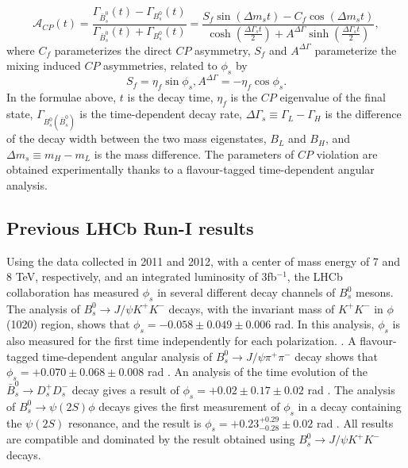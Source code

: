 \documentclass[10pt]{article}
\def\CP                {{\ensuremath{C\!P}}\xspace}
\begin{document}
\begin{equation}
\mathscr{A}_{CP} (t) = \frac{\Gamma_{\bar{B}^0_s}(t)-{\Gamma_{B^0_s}(t)}}{\Gamma_{\bar{B}^0_s}(t) + {\Gamma_{B^0_s}}(t)} = \frac{S_f \sin(\Delta m_s t) - C_f \cos(\Delta m_s t)}{\cosh(\frac{\Delta \Gamma_s  t }{2})  + A^{\Delta \Gamma} \sinh(\frac{\Delta \Gamma_s t}{2})},
\end{equation}
where $C_f$ parameterizes the direct \CP asymmetry,  $S_f$ and $A^{\Delta \Gamma}$ parameterize the mixing induced \CP asymmetries, related to $\phi_s$ by
\begin{equation}
S_f = \eta_f \sin\phi_s, A^{\Delta \Gamma} = -\eta_f \cos \phi_s.
\end{equation}
In the formulae above, $t$ is the decay time, $\eta_f$ is the \CP eigenvalue of the final state, $\Gamma_{B^0_s(\bar{B}^0_s)}$ is the time-dependent decay rate, $\Delta \Gamma_s \equiv \Gamma_L - \Gamma_H$ is the difference of the decay width between the two mass eigenstates, $B_L$ and $B_H$, and $\Delta m_s \equiv m_H - m_L$ is the mass difference. The parameters of \CP violation are obtained experimentally thanks to a flavour-tagged time-dependent angular analysis.

\subsection{Previous LHCb Run-I results}
Using the data collected in 2011 and 2012, with a center of mass energy of 7 and 8 TeV, respectively, and an integrated luminosity of 3fb$^{-1}$, the LHCb collaboration has measured $\phi_s$ in several different decay channels of $B_s^0$ mesons. The analysis of  $B_s^0 \to J/\psi K^+ K^-$ decays, with the invariant mass of $K^+ K^-$ in $\phi$(1020) region, shows that $\phi_s = -0.058 \pm 0.049 \pm 0.006$ rad. In this analysis, $\phi_s$ is also measured for the first time independently for each polarization. \cite{Aaij:2014zsa}.  A flavour-tagged time-dependent angular analysis of $B_s^0 \to J/\psi \pi^+ \pi^-$ decay shows that $\phi_s = +0.070 \pm 0.068 \pm 0.008$ rad \cite{Aaij:2014dka}. An analysis of the time evolution of the $\bar{B}_s^0 \to D_s^+ D_s^-$ decay gives a result of $\phi_s = +0.02 \pm 0.17 \pm 0.02$ rad \cite{Aaij:2014ywt}. The analysis of $B_s^0 \to \psi(2S) \phi$ decays gives the first measurement of $\phi_s$ in a decay containing the $\psi(2S)$ resonance, and the result is $\phi_s =+ 0.23 ^{+0.29}_{-0.28} \pm 0.02$ rad \cite{Aaij:2016ohx}. All results are compatible and dominated by the result obtained using $B^0_s \to J/\psi K^+ K^-$ decays.
\end{document}
